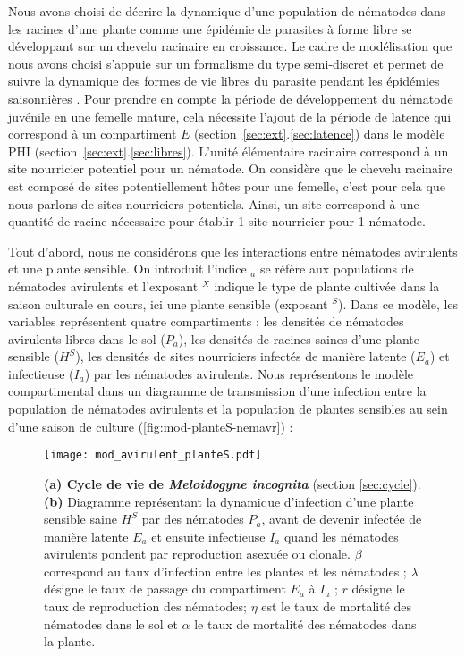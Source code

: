 	Nous avons choisi de décrire la dynamique d’une population de nématodes dans les racines
d’une plante comme une épidémie de parasites à forme libre se développant sur un chevelu racinaire en croissance.
Le cadre de modélisation que nous avons choisi s'appuie sur un formalisme du type semi-discret  et permet de suivre  la dynamique des formes de vie libres du parasite pendant les épidémies saisonnières \citep{Madden2002, Hamelin2011, Mailleret2012}. Pour prendre en compte la période de développement du nématode juvénile en une femelle mature, cela nécessite l'ajout  de la période de latence qui correspond à  un compartiment $E$ (section~\ref{sec:ext}.\ref{sec:latence}) dans le modèle  PHI (section~\ref{sec:ext}.\ref{sec:libres}). L'unité élémentaire racinaire  correspond  à un site nourricier potentiel pour un nématode.  On considère que le chevelu racinaire est composé de sites potentiellement hôtes pour une femelle, c'est pour cela que nous parlons de sites nourriciers potentiels. Ainsi, \og un site \fg{} correspond à une quantité de racine nécessaire pour établir 1 site nourricier pour 1 nématode. 
		 
	Tout d'abord, nous ne considérons que les interactions entre nématodes avirulents  et une plante sensible.
	On introduit l'indice $_a$ se réfère aux populations de nématodes avirulents et l'exposant $^X$  indique le type de plante cultivée dans la saison culturale en cours, ici une plante sensible (exposant $^S$).  Dans ce  modèle,  les variables  représentent quatre compartiments : les densités de nématodes avirulents libres   dans le sol ($P_a$), les densités de racines  saines d'une plante sensible  ($H^S$), les  densités de sites nourriciers infectés  de manière latente ($E_a$) et infectieuse ($I_a$)  par les nématodes avirulents. Nous représentons le modèle 
compartimental dans un diagramme de transmission d’une infection entre la population de nématodes avirulents et la 
population de plantes sensibles au sein d’une saison de culture (\autoref{fig:mod-planteS-nemavr}) :



	\begin{figure}[H]	
		\centering	\texttt{[image: mod\_avirulent\_planteS.pdf]}
		 \caption[Diagramme compartimental de la dynamique d'infection d'une plante par des nématodes.]{\textbf{(a)  Cycle de vie de \textit{Meloidogyne incognita}} (section \ref{sec:cycle}). \textbf{(b)}  Diagramme représentant la 
		 dynamique 
		 d’infection d’une plante sensible saine $H^S$ par des nématodes $P_a$, avant de devenir infectée de manière latente $E_a$  et ensuite infectieuse $I_a$  
		 quand les nématodes avirulents pondent par reproduction asexuée ou clonale. $\beta$
		 correspond au taux d’infection entre les plantes et les nématodes ; 
		 $\lambda$ désigne le taux de passage du compartiment $E_a$ à $I_a$ ; $r$ désigne le taux de reproduction des 
		 nématodes; $\eta$ est le taux de mortalité des nématodes dans le sol et $\alpha$ le taux de mortalité des 
		 nématodes dans la plante.}	
		 \label{fig:mod-planteS-nemavr}		
	\end{figure}
	
